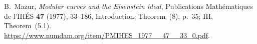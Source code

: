 B.~Mazur, \emph{Modular curves and the Eisenstein ideal},
Publications Math\'ematiques de l'IH\'ES \textbf{47} (1977),
33--186, Introduction, Theorem~(8), p.~35; III, Theorem~(5.1).
\url{https://www.numdam.org/item/PMIHES_1977__47__33_0.pdf}.
